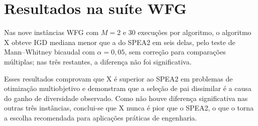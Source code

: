 \section{Resultados na suíte WFG}
\label{sec:fixture_wfg}

Nas nove instâncias WFG com $M = 2$ e 30 execuções por algoritmo, o algoritmo X obteve IGD mediana menor que a do SPEA2 em seis delas, pelo teste de Mann--Whitney bicaudal com $\alpha = 0{,}05$, sem correção para comparações múltiplas; nas três restantes, a diferença não foi significativa.

Esses resultados comprovam que X é superior ao SPEA2 em problemas de otimização multiobjetivo e demonstram que a seleção de pai dissimilar é a causa do ganho de diversidade observado. Como não houve diferença significativa nas outras três instâncias, conclui-se que X nunca é pior que o SPEA2, o que o torna a escolha recomendada para aplicações práticas de engenharia.
